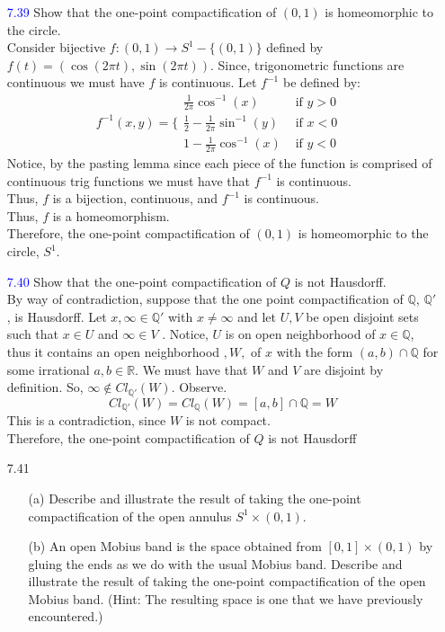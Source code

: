 \documentclass[12pt]{article}
\newcommand{\R}{\mathbb{R}}
\newcommand{\Q}{\mathbb{Q}}
\newcommand{\ak}[1]{\textcolor{blue}{#1}}
\begin{document}
\begin{enumerate}
	
		\item[\ak{7.39}] Show that the one-point compactification of $( 0,1 )$ is homeomorphic to the
		circle.\\
		Consider bijective $ f:(0,1)\rightarrow S^1-\{(0,1)\} $ defined by $ f(t)=(\cos(2\pi t), \sin(2\pi t)) $. Since, trigonometric functions are continuous we must have $ f $ is continuous. Let $ f^{-1} $ be defined by:
			\[f^{-1}(x,y)=\{\begin{array} {ll} 
					{\frac{1}{2\pi}\cos^{-1}(x)} & {\text{ if  $y > 0$ }} \\
					{\frac{1}{2}-\frac{1}{2\pi}\sin^{-1}(y)} & {\text { if $x < 0$}}\\
					{1-\frac{1}{2\pi}\cos^{-1}(x)} & {\text { if $y < 0$}}  
		  	\end{array}\] 
		Notice, by the pasting lemma since each piece of the function is comprised of continuous trig functions we must have that $ f^{-1} $ is continuous.\\
		Thus, $ f $ is a bijection, continuous, and $ f^{-1} $ is continuous.\\
		Thus, $ f $ is a homeomorphism.\\
		Therefore, the one-point compactification of $( 0,1 )$ is homeomorphic to the
		circle, $ S^1 $.	
		\item[\ak{7.40}] Show that the one-point compactification of $Q$ is not Hausdorff.\\
		By way of contradiction, suppose that the one point compactification of $ \Q $, $ \Q' $, is Hausdorff. Let $ x, \infty \in \Q'  $ with $ x\neq \infty $ and let $ U,V $ be open disjoint sets such that $ x\in U $ and $ \infty\in V $ . Notice, $ U $ is on open neighborhood of $ x \in \Q $, thus it contains an open neighborhood $ ,W, $ of $ x $ with the form $ (a,b)\cap \Q$ for some irrational $ a,b\in\R $. We must have that $ W $ and $ V $ are disjoint by definition. So, $ \infty \not\in Cl_{\Q'}(W) $. Observe.
			\[Cl_{\Q'}(W)=Cl_\Q(W)=[a,b]\cap\Q=W\]
		This is a contradiction, since $ W $ is not compact.\\
		Therefore, the one-point compactification of $Q$ is not Hausdorff	
		\item[7.41]
		\begin{enumerate}
			\item[(a)] Describe and illustrate the result of taking the one-point compactification
			of the open annulus $S ^ { 1 } \times ( 0,1 ) .$
			
			\item[(b)] An open Mobius band is the space obtained from $[ 0,1 ] \times ( 0,1 )$ by gluing the ends as we do with the usual Mobius band. Describe and illustrate the
			result of taking the one-point compactification of the open Mobius band.
			(Hint: The resulting space is one that we have previously encountered.)
		\end{enumerate}
		

\end{enumerate}
\end{document}

